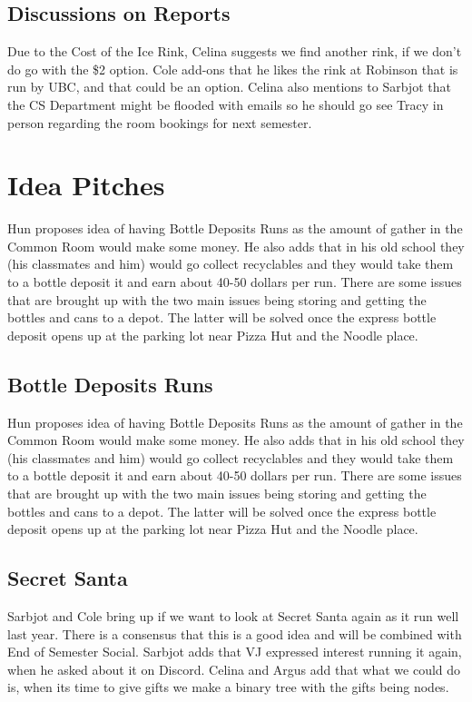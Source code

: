 \documentclass[12pt]{article}
\begin{document}
\subsection{Discussions on Reports}
\noindent Due to the Cost of the Ice Rink, Celina suggests we find another rink, if we don't do go with the \$2 option. Cole add-ons that he likes the rink at Robinson that is run by UBC, and that could be an option. Celina also mentions to Sarbjot that the CS Department might be flooded with emails so he should go see Tracy in person regarding the room bookings for next semester. 

\section{Idea Pitches} \label{sec: Idea}
\noindent Hun proposes idea of having Bottle Deposits Runs as the amount of gather in the Common Room would make some money. He also adds that in his old school they (his classmates and him) would go collect recyclables and they would take them to a bottle deposit it and earn about 40-50 dollars per run. There are some issues that are brought up with the two main issues being storing and getting the bottles and cans to a depot. The latter will be solved once the express bottle deposit opens up at the parking lot near Pizza Hut and the Noodle place.  \\ 
\subsection{Bottle Deposits Runs}
\noindent Hun proposes idea of having Bottle Deposits Runs as the amount of gather in the Common Room would make some money. He also adds that in his old school they (his classmates and him) would go collect recyclables and they would take them to a bottle deposit it and earn about 40-50 dollars per run. There are some issues that are brought up with the two main issues being storing and getting the bottles and cans to a depot. The latter will be solved once the express bottle deposit opens up at the parking lot near Pizza Hut and the Noodle place. 

\subsection{Secret Santa}
\noindent Sarbjot and Cole bring up if we want to look at Secret Santa again as it run well last year. There is a consensus that this is a good idea and will be combined with End of Semester Social. Sarbjot adds that VJ expressed interest running it again, when he asked about it on Discord.  Celina and Argus add that what we could do is, when its time to give gifts we make a binary tree with the gifts being nodes. 
\end{document}
